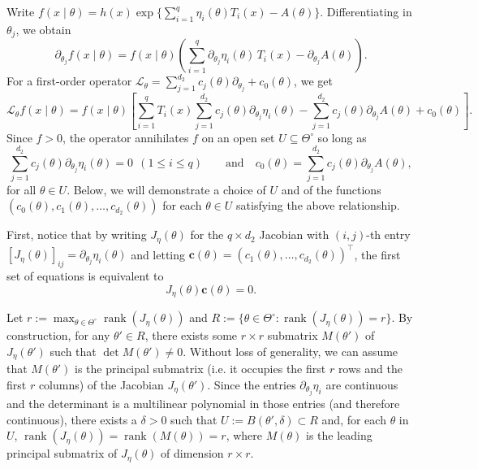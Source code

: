 \documentclass[11pt,twoside]{article} %
\begin{document}
Write $f(x\mid\theta)=h(x)\exp\{\sum_{i=1}^q\eta_i(\theta)T_i(x)-A(\theta)\}$.
Differentiating in $\theta_j$, we obtain
\begin{equation*}
    \partial_{\theta_j}f(x\mid\theta)=f(x\mid\theta)\left(\sum_{i=1}^q\partial_{\theta_j}\eta_i(\theta)\,T_i(x)-\partial_{\theta_j}A(\theta)\right).
\end{equation*}
For a first-order operator $\mathcal L_\theta=\sum_{j=1}^{d_2}c_j(\theta)\partial_{\theta_j}+c_0(\theta)$, we get
\begin{equation*}
    \mathcal L_\theta f(x\mid\theta)
    =f(x\mid\theta)\left[\sum_{i=1}^q T_i(x)\sum_{j=1}^{d_2}c_j(\theta)\partial_{\theta_j}\eta_i(\theta)
    -\sum_{j=1}^{d_2}c_j(\theta)\partial_{\theta_j}A(\theta)+c_0(\theta)\right].
\end{equation*}
Since $f>0$, the operator annihilates $f$ on an open set $U\subseteq \Theta^\circ$ so long as
\begin{equation}
    \sum_{j=1}^{d_2}c_j(\theta)\partial_{\theta_j}\eta_i(\theta)=0\ \ (1\le i\le q)
    \qquad \text{and} \quad 
    c_0(\theta)=\sum_{j=1}^{d_2}c_j(\theta)\partial_{\theta_j}A(\theta)
    \label{eq:app_exp_1},
\end{equation}
for all $\theta\in U$. Below, we will demonstrate a choice of $U$ and of the functions $(c_0(\theta), c_1(\theta), \ldots, c_{d_2}(\theta))$ for each $\theta \in U$ satisfying the above relationship.

First, notice that by writing $J_\eta(\theta)$ for the $q\times d_2$ Jacobian with $(i,j)$-th entry $[J_\eta(\theta)]_{ij}=\partial_{\theta_j}\eta_i(\theta)$
and letting $\mathbf c(\theta)=(c_1(\theta),\dots,c_{d_2}(\theta))^\top$, the first set of equations is equivalent to
\begin{equation}\label{eq:JC}
J_\eta(\theta)\mathbf c(\theta)=0.    
\end{equation}


Let $r := \max_{\theta \in \Theta^\circ} \operatorname{rank}(J_\eta(\theta))$ %
and 
$R := \{\theta \in \Theta^\circ : \operatorname{rank}(J_\eta(\theta)) = r\}$.  By construction, for any $\theta' \in R$, there exists  some $r \times r$ submatrix $M(\theta')$ of $J_\eta(\theta')$
such that $\det M(\theta') \ne 0$. Without loss of generality, we can assume that $M(\theta')$ is the principal submatrix (i.e. it occupies the first $r$ rows and the first $r$ columns) of the Jacobian $J_{\eta}(\theta')$. Since the entries $\partial_{\theta_j}\eta_i$ are continuous and the
determinant is a multilinear polynomial in those entries (and therefore continuous), there exists a $\delta > 0$ such that  $U := B(\theta',\delta) \subset R$ and, for each $\theta$ in $U$,  $ \operatorname{rank}(J_\eta(\theta)) = \operatorname{rank}(M(\theta)) = r$, where $M(\theta)$ is the leading principal submatrix of $J_\eta(\theta)$ of dimension $r \times r$.
\end{document}
